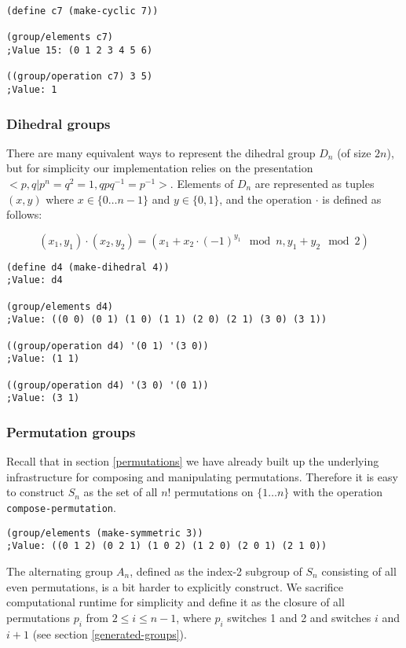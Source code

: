 \documentclass{article}
\begin{document}
\begin{verbatim}         
(define c7 (make-cyclic 7))

(group/elements c7)
;Value 15: (0 1 2 3 4 5 6)

((group/operation c7) 3 5)
;Value: 1
\end{verbatim}
        
            \subsubsection{Dihedral groups}
        
                There are many equivalent ways to represent the dihedral group $D_n$ (of size $2n$), but for simplicity our implementation relies on the presentation $<p,q|p^n = q^2 = 1, qpq^{-1} = p^{-1}>$. Elements of $D_n$ are represented as tuples $(x,y)$ where $x \in \{ 0 \ldots n-1\}$ and $y \in \{0, 1\}$, and the operation $\cdot$ is defined as follows:
        
                $$(x_1,y_1) \cdot (x_2,y_2) = (x_1 + x_2 \cdot (-1)^{y_1} \mod n, y_1 + y_2 \mod 2)$$
        
\begin{verbatim}
(define d4 (make-dihedral 4))
;Value: d4

(group/elements d4)
;Value: ((0 0) (0 1) (1 0) (1 1) (2 0) (2 1) (3 0) (3 1))

((group/operation d4) '(0 1) '(3 0))
;Value: (1 1)

((group/operation d4) '(3 0) '(0 1))
;Value: (3 1)
\end{verbatim}
        
            \subsubsection{Permutation groups}
                
                Recall that in section \ref{permutations} we have already built up the underlying infrastructure for composing and manipulating permutations. Therefore it is easy to construct $S_n$ as the set of all $n!$ permutations on $\{1\ldots n\}$ with the operation \texttt{compose-permutation}.

\begin{verbatim}
(group/elements (make-symmetric 3))
;Value: ((0 1 2) (0 2 1) (1 0 2) (1 2 0) (2 0 1) (2 1 0))
\end{verbatim}        

                The alternating group $A_n$, defined as the index-2 subgroup of $S_n$ consisting of all even permutations, is a bit harder to explicitly construct. We sacrifice computational runtime for simplicity and define it as the closure of all permutations $p_i$ from $2\leq i \leq n-1$, where $p_i$ switches 1 and 2 and switches $i$ and $i+1$ (see section \ref{generated-groups}).
		
\end{document}

